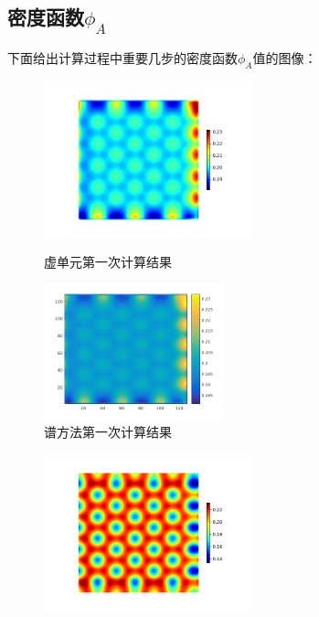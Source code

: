 \documentclass[12pt]{article}
\begin{document}
\begin{CJK}{UTF8}{gkai}
\section{密度函数$\phi_A$}
下面给出计算过程中重要几步的密度函数$\phi_A$值的图像：\\ 
 \begin{figure}[H]
	\setlength{\abovecaptionskip}{0.cm}
	\setlength{\belowcaptionskip}{-0.cm}
	\begin{minipage}[!htbp]{0.3\linewidth}
		\includegraphics[width=6cm]{scftfigure1.png}
		\caption*{虚单元第一次计算结果}
	\end{minipage}
	\hspace{0.23in}
	\begin{minipage}[!htbp]{0.3\linewidth}
		\includegraphics[width=5.2cm]{1.png}
		\caption*{谱方法第一次计算结果}
	\end{minipage}
\end{figure}
  \begin{figure}[H]
 	\setlength{\abovecaptionskip}{0.cm}
 	\setlength{\belowcaptionskip}{-0.cm}
 	\begin{minipage}[!htbp]{0.3\linewidth}
 		\includegraphics[width=6cm]{scftfigure2.png}

\end{minipage}
\end{figure}
\end{CJK}
\end{document}
